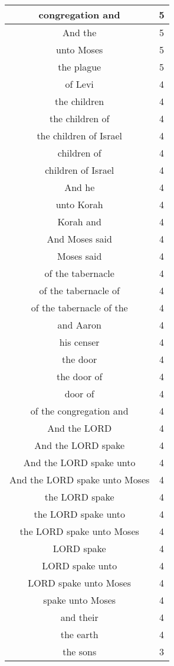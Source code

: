 \begin{center}
\begin{longtable}{|c|c|}
congregation and & 5\\ \hline 
And the & 5\\ \hline 
unto Moses & 5\\ \hline 
the plague & 5\\ \hline 
of Levi & 4\\ \hline 
the children & 4\\ \hline 
the children of & 4\\ \hline 
the children of Israel & 4\\ \hline 
children of & 4\\ \hline 
children of Israel & 4\\ \hline 
And he & 4\\ \hline 
unto Korah & 4\\ \hline 
Korah and & 4\\ \hline 
And Moses said & 4\\ \hline 
Moses said & 4\\ \hline 
of the tabernacle & 4\\ \hline 
of the tabernacle of & 4\\ \hline 
of the tabernacle of the & 4\\ \hline 
and Aaron & 4\\ \hline 
his censer & 4\\ \hline 
the door & 4\\ \hline 
the door of & 4\\ \hline 
door of & 4\\ \hline 
of the congregation and & 4\\ \hline 
And the LORD & 4\\ \hline 
And the LORD spake & 4\\ \hline 
And the LORD spake unto & 4\\ \hline 
And the LORD spake unto Moses & 4\\ \hline 
the LORD spake & 4\\ \hline 
the LORD spake unto & 4\\ \hline 
the LORD spake unto Moses & 4\\ \hline 
LORD spake & 4\\ \hline 
LORD spake unto & 4\\ \hline 
LORD spake unto Moses & 4\\ \hline 
spake unto Moses & 4\\ \hline 
and their & 4\\ \hline 
the earth & 4\\ \hline 
the sons & 3\\ \hline 

\end{longtable}
\end{center}
